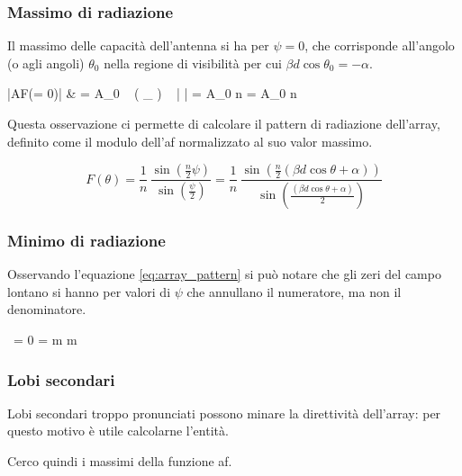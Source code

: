 		\subsubsection{Massimo di radiazione}
			Il massimo delle capacità dell'antenna si ha per $\psi = 0$, che corrisponde all'angolo (o agli angoli) $\theta_0$ nella regione di visibilità per cui $\beta d \cos \theta_0 = -\alpha$.

			\begin{esp}
				|AF(\psi = 0)|
					& = A_0
						~ \left( \lim_{\psi {}} \frac{ \sin(\frac{n}{2} \psi) }{ \sin(\frac{\psi}{2}) } \right)
						~ \left| \frac{ e^{\jmath \frac{n-1}{2} \psi} }{ e^{\jmath \psi} } \right|
						= A_0 \cdot n \cdot 1 = A_0 \cdot n
			\end{esp}

			Questa osservazione ci permette di calcolare il pattern di radiazione dell'array, definito come il modulo dell'\gls{af} normalizzato al suo valor massimo.

			\begin{equation} \label{eq:array_pattern}
				F(\theta)
					= \frac{1}{n} \, 
					= \frac{1}{n} \, \frac{
						\sin \left(
							\frac{n}{2} (\beta d \cos \theta + \alpha)
						\right)
					}{
						\sin \left(
							\frac{(\beta d \cos \theta + \alpha)}{2}
						\right)
					}
			\end{equation}

		\subsubsection{Minimo di radiazione}
			Osservando l'equazione \ref{eq:array_pattern} si può notare che gli zeri del campo lontano si hanno per valori di $\psi$ che annullano il numeratore, ma non il denominatore.

			\begin{esp}
				 \, \frac{\sin(\frac{n}{2} \psi) }{ \sin( \frac{\psi}{2} ) } = 0
				\Leftrightarrow
					 \psi = \pm m \pi \quad \forall m \neq 0
			\end{esp}

		\subsubsection{Lobi secondari}
			Lobi secondari troppo pronunciati possono minare la direttività dell'array: per questo motivo è utile calcolarne l'entità.

			Cerco quindi i massimi della funzione \gls{af}.

